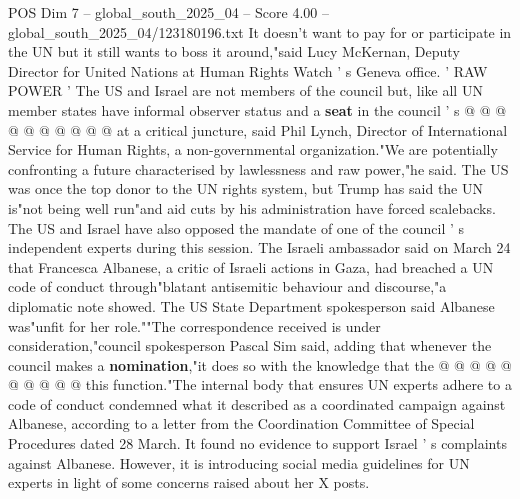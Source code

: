 \begin{textsample}{POS Dim 7 – global\_south\_2025\_04 – Score 4.00 – global\_south\_2025\_04/123180196.txt}
It doesn't want to pay for or participate in the UN but it still wants to boss it around,"said Lucy McKernan, Deputy Director for United Nations at Human Rights Watch ' s Geneva office. ' RAW POWER ' The US and Israel are not members of the council but, like all UN member states have informal observer status and a \textbf{seat} in the council ' s @ @ @ @ @ @ @ @ @ @ at a critical juncture, said Phil Lynch, Director of International Service for Human Rights, a non-governmental organization."We are potentially confronting a future characterised by lawlessness and raw power,"he said.
The US was once the top donor to the UN rights system, but Trump has said the UN is"not being well run"and aid cuts by his administration have forced scalebacks.
The US and Israel have also opposed the mandate of one of the council ' s independent experts during this session.
The Israeli ambassador said on March 24 that Francesca Albanese, a critic of Israeli actions in Gaza, had breached a UN code of conduct through"blatant antisemitic behaviour and discourse,"a diplomatic note showed.
The US State Department spokesperson said Albanese was"unfit for her role.""The correspondence received is under consideration,"council spokesperson Pascal Sim said, adding that whenever the council makes a \textbf{nomination},"it does so with the knowledge that the @ @ @ @ @ @ @ @ @ @ this function."The internal body that ensures UN experts adhere to a code of conduct condemned what it described as a coordinated campaign against Albanese, according to a letter from the Coordination Committee of Special Procedures dated 28 March.
It found no evidence to support Israel ' s complaints against Albanese.
However, it is introducing social media guidelines for UN experts in light of some concerns raised about her X posts.

\end{textsample}
